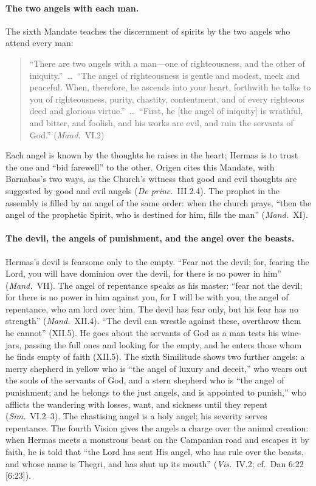 \paragraph{The two angels with each man.} The sixth Mandate teaches the
discernment of spirits by the two angels who attend every man:

\begin{quote}
``There are two angels with a man---one of righteousness, and the other
of iniquity.''~\dots\ ``The angel of righteousness is gentle and modest,
meek and peaceful. When, therefore, he ascends into your heart,
forthwith he talks to you of righteousness, purity, chastity,
contentment, and of every righteous deed and glorious virtue.''~\dots\
``First, he [the angel of iniquity] is wrathful, and bitter, and foolish,
and his works are evil, and ruin the servants of God.'' (\emph{Mand.}\
VI.2)
\end{quote}

\noindent Each angel is known by the thoughts he raises in the heart;
Hermas is to trust the one and ``bid farewell'' to the other. Origen cites
this Mandate, with Barnabas's two ways, as the Church's witness that good
and evil thoughts are suggested by good and evil angels (\emph{De princ.}\
III.2.4). The prophet in the assembly is filled by an angel of the same
order: when the church prays, ``then the angel of the prophetic Spirit,
who is destined for him, fills the man'' (\emph{Mand.}\ XI).

\paragraph{The devil, the angels of punishment, and the angel over the
beasts.} Hermas's devil is fearsome only to the empty. ``Fear not the
devil; for, fearing the Lord, you will have dominion over the devil, for
there is no power in him'' (\emph{Mand.}\ VII). The angel of repentance
speaks as his master: ``fear not the devil; for there is no power in him
against you, for I will be with you, the angel of repentance, who am lord
over him. The devil has fear only, but his fear has no strength''
(\emph{Mand.}\ XII.4). ``The devil can wrestle against these, overthrow
them he cannot'' (XII.5). He goes about the servants of God as a man
tests his wine-jars, passing the full ones and looking for the empty, and
he enters those whom he finds empty of faith (XII.5). The sixth Similitude
shows two further angels: a merry shepherd in yellow who is ``the angel of
luxury and deceit,'' who wears out the souls of the servants of God, and a
stern shepherd who is ``the angel of punishment; and he belongs to the
just angels, and is appointed to punish,'' who afflicts the wandering with
losses, want, and sickness until they repent (\emph{Sim.}\ VI.2--3). The
chastising angel is a holy angel; his severity serves repentance. The
fourth Vision gives the angels a charge over the animal creation: when
Hermas meets a monstrous beast on the Campanian road and escapes it by
faith, he is told that ``the Lord has sent His angel, who has rule over the
beasts, and whose name is Thegri, and has shut up its mouth'' (\emph{Vis.}\
IV.2; cf.\ Dan 6:22 [6:23]).

